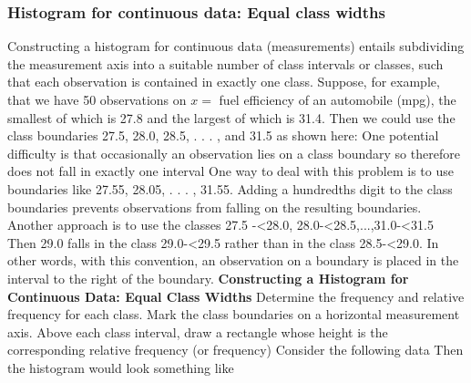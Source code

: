 \documentclass{report}
\begin{document}
\pagebreak 
\subsubsection{Histogram for continuous data: Equal class widths} 
\bigbreak \noindent 
Constructing a histogram for continuous data (measurements) entails subdividing the measurement axis into a suitable number of class intervals or classes,
such that each observation is contained in exactly one class. Suppose, for example,
that we have 50 observations on $x=$ fuel efficiency of an automobile (mpg), the
smallest of which is 27.8 and the largest of which is 31.4. Then we could use the
class boundaries 27.5, 28.0, 28.5, . . . , and 31.5 as shown here:
\bigbreak \noindent 
{}
\bigbreak \noindent 
One potential difficulty is that occasionally an observation lies on a class boundary so therefore does not fall in exactly one interval
\bigbreak \noindent 
One way
to deal with this problem is to use boundaries like 27.55, 28.05, . . . , 31.55.
Adding a hundredths digit to the class boundaries prevents observations from
falling on the resulting boundaries. Another approach is to use the classes
27.5 -<28.0, 28.0-<28.5,...,31.0-<31.5 Then 29.0 falls in the class 29.0-<29.5
rather than in the class 28.5-<29.0. In other words, with this convention, an observation on a boundary is placed in the interval to the right of the
boundary. 
\bigbreak \noindent 
\textbf{Constructing a Histogram for Continuous Data: Equal Class Widths}
\bigbreak \noindent 
Determine the frequency and relative frequency for each class. Mark the
class boundaries on a horizontal measurement axis. Above each class interval, draw a rectangle whose height is the corresponding relative frequency
(or frequency)
\bigbreak \noindent 
Consider the following data
\bigbreak \noindent 
{}
\bigbreak \noindent 
Then the histogram would look something like
\bigbreak \noindent 
{}

\pagebreak 
\end{document}
